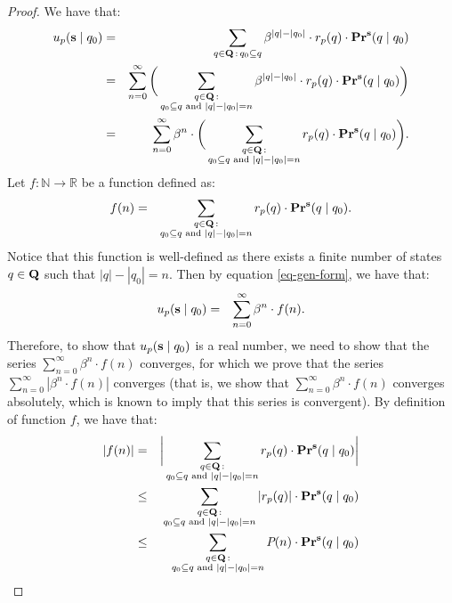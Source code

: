 \begin{proof}
We have that:
\begin{eqnarray}
\notag
u_p(\mathbf{s} \mid q_0) & =  & \sum_{q \in \mathbf{Q} \,:\, q_0 \subseteq q} \beta^{|q|-|q_0|} \cdot  r_p(q) \cdot \mathbf{Pr}^{\mathbf{s}}(q \mid q_0)\\
\notag
& = & \sum_{n=0}^\infty \bigg(\sum_{\substack{q \in \mathbf{Q} \,: \\ q_0 \subseteq q \text{ {\rm and} } |q| - |q_0| = n}} \beta^{|q|-|q_0|} \cdot  r_p(q) \cdot \mathbf{Pr}^{\mathbf{s}}(q \mid q_0)\bigg)\\
\label{eq-gen-form}
& = & \sum_{n=0}^\infty \beta^n \cdot \bigg(\sum_{\substack{q \in \mathbf{Q} \,: \\ q_0 \subseteq q \text{ {\rm and} } |q| - |q_0| = n}} r_p(q) \cdot \mathbf{Pr}^{\mathbf{s}}(q \mid q_0)\bigg).
\end{eqnarray}
Let $f : \mathbb{N} \to \mathbb{R}$ be a function defined as:
\begin{eqnarray*}
f(n) & = & \sum_{\substack{q \in \mathbf{Q} \,: \\ q_0 \subseteq q \text{ {\rm and} } |q| - |q_0| = n}} r_p(q) \cdot \mathbf{Pr}^{\mathbf{s}}(q \mid q_0).
\end{eqnarray*}
Notice that this function is well-defined as there exists a finite number of states $q \in \mathbf{Q}$ such that $|q| - |q_0| = n$. Then by equation \eqref{eq-gen-form}, we have that:
\begin{eqnarray*}
u_p(\mathbf{s} \mid q_0) & = & \sum_{n=0}^\infty \beta^n \cdot f(n).
\end{eqnarray*}
Therefore, to show that $u_p(\mathbf{s} \mid q_0)$ is a real number, we need to show that the series $ \sum_{n=0}^\infty \beta^n \cdot f(n)$ converges, for which we prove that the series $ \sum_{n=0}^\infty |\beta^n \cdot f(n)|$ converges (that is, we show that $ \sum_{n=0}^\infty \beta^n \cdot f(n)$ converges absolutely, which is known to imply that this series is convergent). By definition of function $f$, we have that:
\begin{eqnarray}
\notag
|f(n)| & = & \bigg| \sum_{\substack{q \in \bQ \,: \\ q_0 \subseteq q \text{ {\rm and} } |q| - |q_0| = n}} r_p(q) \cdot \pr^{\bs}(q \mid q_0) \bigg|\\
\notag
& \leq & \sum_{\substack{q \in \bQ \,: \\ q_0 \subseteq q \text{ {\rm and} } |q| - |q_0| = n}} |r_p(q)| \cdot \pr^{\bs}(q \mid q_0)\\
\notag
& \leq & \sum_{\substack{q \in \bQ \,: \\ q_0 \subseteq q \text{ {\rm and} } |q| - |q_0| = n}} \pol(n) \cdot \pr^{\bs}(q \mid q_0)\\

\end{eqnarray}
\end{proof}
